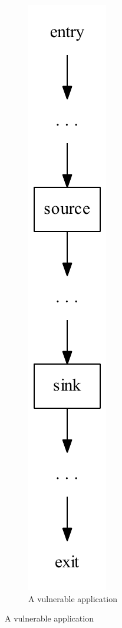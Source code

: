 \begin{figure}
  \begin{subfigure}[b]{0.5\textwidth}
    \centering
    \includegraphics[scale=0.8]{figures/dot_files/unsanitised.pdf}
    \caption{A vulnerable application}\label{vulnerabilities_unsanitised}

\end{subfigure}
\end{figure}
